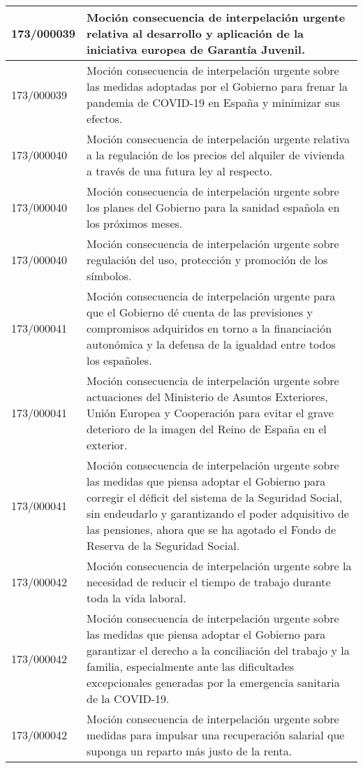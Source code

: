 {\begin{table}[H]
\begin{center}
\begin{tabularx}{\linewidth}{| l | X |}
\hline
173/000039 & Moción consecuencia de interpelación urgente relativa al desarrollo y aplicación de la iniciativa europea de Garantía Juvenil. \\
\hline
173/000039 & Moción consecuencia de interpelación urgente sobre las medidas adoptadas por el Gobierno para frenar la pandemia de COVID-19 en España y minimizar sus efectos. \\
\hline
173/000040 & Moción consecuencia de interpelación urgente relativa a la regulación de los precios del alquiler de vivienda a través de una futura ley al respecto. \\
\hline
173/000040 & Moción consecuencia de interpelación urgente sobre los planes del Gobierno para la sanidad española en los próximos meses. \\
\hline
173/000040 & Moción consecuencia de interpelación urgente sobre regulación del uso, protección y promoción de los símbolos. \\
\hline
173/000041 & Moción consecuencia de interpelación urgente para que el Gobierno dé cuenta de las previsiones y compromisos adquiridos en torno a la financiación autonómica y la defensa de la igualdad entre todos los españoles. \\
\hline
173/000041 & Moción consecuencia de interpelación urgente sobre actuaciones del Ministerio de Asuntos Exteriores, Unión Europea y Cooperación para evitar el grave deterioro de la imagen del Reino de España en el exterior. \\
\hline
173/000041 & Moción consecuencia de interpelación urgente sobre las medidas que piensa adoptar el Gobierno para corregir el déficit del sistema de la Seguridad Social, sin endeudarlo y garantizando el poder adquisitivo de las pensiones, ahora que se ha agotado el Fondo de Reserva de la Seguridad Social. \\
\hline
173/000042 & Moción consecuencia de interpelación urgente sobre la necesidad de reducir el tiempo de trabajo durante toda la vida laboral. \\
\hline
173/000042 & Moción consecuencia de interpelación urgente sobre las medidas que piensa adoptar el Gobierno para garantizar el derecho a la conciliación del trabajo y la familia, especialmente ante las dificultades excepcionales generadas por la emergencia sanitaria de la COVID-19. \\
\hline
173/000042 & Moción consecuencia de interpelación urgente sobre medidas para impulsar una recuperación salarial que suponga un reparto más justo de la renta. \\

\end{tabularx}
\end{center}
\end{table}}
